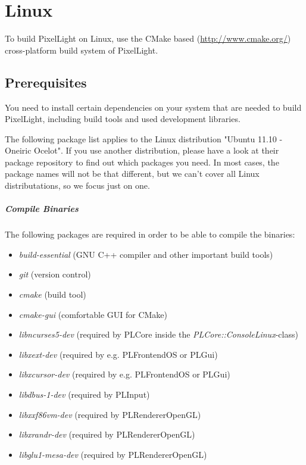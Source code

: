 \chapter{Linux}
To build PixelLight on Linux, use the CMake based (\url{http://www.cmake.org/}) cross-platform build system of PixelLight.




\section{Prerequisites}
You need to install certain dependencies on your system that are needed to build PixelLight, including build tools and used development libraries.

The following package list applies to the Linux distribution "Ubuntu 11.10 - Oneiric Ocelot". If you use another distribution, please have a look at their package repository to find out which packages you need. In most cases, the package names will not be that different, but we can't cover all Linux distributations, so we focus just on one.


\paragraph{Compile Binaries}
The following packages are required in order to be able to compile the binaries:
\begin{itemize}
\item{\emph{build-essential} (GNU C++ compiler and other important build tools)}
\item{\emph{git} (version control)}
\item{\emph{cmake} (build tool)}
\item{\emph{cmake-gui} (comfortable GUI for CMake)}
\item{\emph{libncurses5-dev} (required by PLCore inside the \emph{PLCore::ConsoleLinux}-class)}
\item{\emph{libxext-dev} (required by e.g. PLFrontendOS or PLGui)}
\item{\emph{libxcursor-dev} (required by e.g. PLFrontendOS or PLGui)}
\item{\emph{libdbus-1-dev} (required by PLInput)}
\item{\emph{libxxf86vm-dev} (required by PLRendererOpenGL)}
\item{\emph{libxrandr-dev} (required by PLRendererOpenGL)}
\item{\emph{libglu1-mesa-dev} (required by PLRendererOpenGL)}
\end{itemize}

